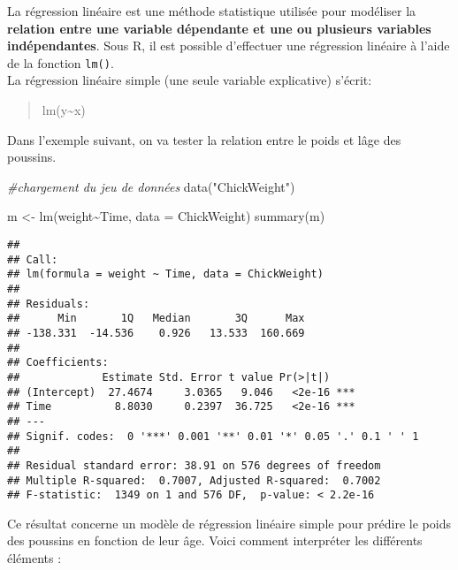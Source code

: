 \documentclass[
]{article}
\newenvironment{Shaded}{\begin{snugshade}}{\end{snugshade}}
\newcommand{\AttributeTok}[1]{\textcolor[rgb]{0.77,0.63,0.00}{#1}}
\newcommand{\CommentTok}[1]{\textcolor[rgb]{0.56,0.35,0.01}{\textit{#1}}}
\newcommand{\FunctionTok}[1]{\textcolor[rgb]{0.00,0.00,0.00}{#1}}
\newcommand{\NormalTok}[1]{#1}
\newcommand{\OtherTok}[1]{\textcolor[rgb]{0.56,0.35,0.01}{#1}}
\newcommand{\SpecialCharTok}[1]{\textcolor[rgb]{0.00,0.00,0.00}{#1}}
\newcommand{\StringTok}[1]{\textcolor[rgb]{0.31,0.60,0.02}{#1}}
\begin{document}
La régression linéaire est une méthode statistique utilisée pour modéliser la \textbf{relation entre une variable dépendante et une ou plusieurs variables indépendantes}. Sous R, il est possible d'effectuer une régression linéaire à l'aide de la fonction \texttt{lm()}.\\
La régression linéaire simple (une seule variable explicative) s'écrit:

\begin{quote}
lm(y\textasciitilde x)
\end{quote}

Dans l'exemple suivant, on va tester la relation entre le poids et lâge des poussins.

\begin{Shaded}
\begin{Highlighting}[]
\CommentTok{\#chargement du jeu de données}
\FunctionTok{data}\NormalTok{(}\StringTok{"ChickWeight"}\NormalTok{)}

\NormalTok{m }\OtherTok{\textless{}{-}} \FunctionTok{lm}\NormalTok{(weight}\SpecialCharTok{\textasciitilde{}}\NormalTok{Time, }\AttributeTok{data =}\NormalTok{ ChickWeight)}
\FunctionTok{summary}\NormalTok{(m)}
\end{Highlighting}
\end{Shaded}

\begin{verbatim}
## 
## Call:
## lm(formula = weight ~ Time, data = ChickWeight)
## 
## Residuals:
##      Min       1Q   Median       3Q      Max 
## -138.331  -14.536    0.926   13.533  160.669 
## 
## Coefficients:
##             Estimate Std. Error t value Pr(>|t|)    
## (Intercept)  27.4674     3.0365   9.046   <2e-16 ***
## Time          8.8030     0.2397  36.725   <2e-16 ***
## ---
## Signif. codes:  0 '***' 0.001 '**' 0.01 '*' 0.05 '.' 0.1 ' ' 1
## 
## Residual standard error: 38.91 on 576 degrees of freedom
## Multiple R-squared:  0.7007, Adjusted R-squared:  0.7002 
## F-statistic:  1349 on 1 and 576 DF,  p-value: < 2.2e-16
\end{verbatim}

Ce résultat concerne un modèle de régression linéaire simple pour prédire le poids des poussins en fonction de leur âge. Voici comment interpréter les différents éléments :
\end{document}
